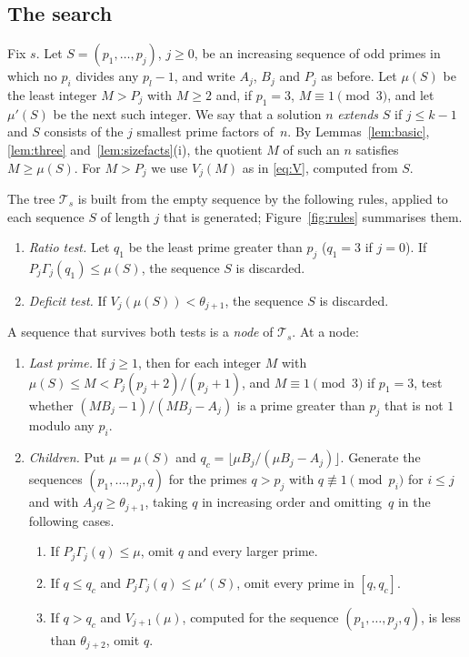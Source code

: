 \documentclass[screen,reqno]{aomart}
\numberwithin{equation}{section}
\theoremstyle{plain}
\theoremstyle{definition}
\theoremstyle{remark}
\begin{document}
\subsection{The search}\label{sec:sizesearch}
Fix $s$. Let $S=(p_1,\dots,p_j)$, $j\ge0$, be an increasing sequence
of odd primes in which no $p_i$ divides any $p_l-1$, and write $A_j$,
$B_j$ and $P_j$ as before. Let $\mu(S)$ be the least integer $M>P_j$
with $M\ge2$ and, if $p_1=3$, $M\equiv1\pmod3$, and let $\mu'(S)$ be
the next such integer. We say that a solution $n$ \emph{extends} $S$
if $j\le k-1$ and $S$ consists of the $j$ smallest prime factors
of~$n$. By Lemmas~\ref{lem:basic}, \ref{lem:three}
and~\ref{lem:sizefacts}(i), the quotient $M$ of such an $n$ satisfies
$M\ge\mu(S)$. For $M>P_j$ we use $V_j(M)$ as in \eqref{eq:V},
computed from $S$.

The tree $\mathcal T_s$ is built from the empty sequence by the
following rules, applied to each sequence $S$ of length $j$ that is
generated; Figure~\ref{fig:rules} summarises them.

\begin{enumerate}[label=\textup{(R\arabic*)},leftmargin=*]
\item\label{r:ratio} \emph{Ratio test.} Let $q_1$ be the least prime
greater than $p_j$ ($q_1=3$ if $j=0$). If $P_j\Gamma_j(q_1)\le\mu(S)$,
the sequence $S$ is discarded.
\item\label{r:deficit} \emph{Deficit test.} If
$V_j(\mu(S))<\theta_{j+1}$, the sequence $S$ is discarded.
\end{enumerate}
A sequence that survives both tests is a \emph{node} of
$\mathcal T_s$. At a node:
\begin{enumerate}[label=\textup{(R\arabic*)},leftmargin=*,resume]
\item\label{r:last} \emph{Last prime.} If $j\ge1$, then for each
integer $M$ with $\mu(S)\le M<P_j(p_j+2)/(p_j+1)$, and
$M\equiv1\pmod3$ if $p_1=3$, test whether
$(MB_j-1)/(MB_j-A_j)$ is a prime greater than $p_j$ that is not $1$
modulo any $p_i$.
\item\label{r:children} \emph{Children.} Put $\mu=\mu(S)$ and
$q_c=\lfloor\mu B_j/(\mu B_j-A_j)\rfloor$. Generate the sequences
$(p_1,\dots,p_j,q)$ for the primes $q>p_j$ with
$q\not\equiv1\pmod{p_i}$ for $i\le j$ and with $A_jq\ge\theta_{j+1}$,
taking $q$ in increasing order and omitting~$q$ in the following
cases.
\begin{enumerate}[label=(\roman*)]
\item If $P_j\Gamma_j(q)\le\mu$, omit $q$ and every larger prime.
\item If $q\le q_c$ and $P_j\Gamma_j(q)\le\mu'(S)$, omit every prime
in $[q,q_c]$.
\item If $q>q_c$ and $V_{j+1}(\mu)$, computed for the sequence
$(p_1,\dots,p_j,q)$, is less than $\theta_{j+2}$, omit $q$.
\end{enumerate}
\end{enumerate}
\end{document}
